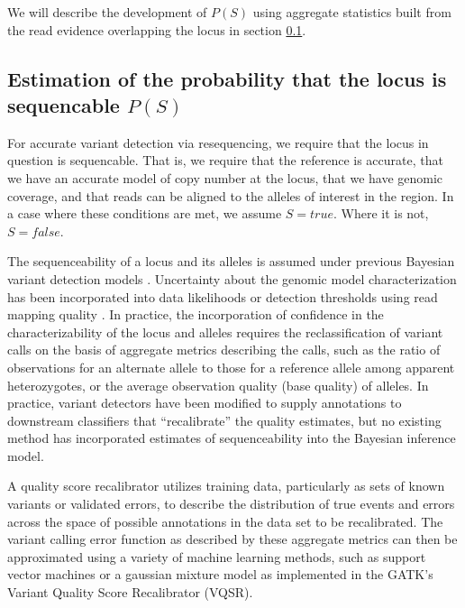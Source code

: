 \documentclass{article}
\begin{document}
We will describe the development of $P(S)$ using aggregate statistics built from the read evidence overlapping the locus in section \ref{sec:sequencable}.

\subsection{Estimation of the probability that the locus is sequencable $P(S)$}
\label{sec:sequencable}

For accurate variant detection via resequencing, we require that the locus in question is sequencable.  That is, we require that the reference is accurate, that we have an accurate model of copy number at the locus, that we have genomic coverage, and that reads can be aligned to the alleles of interest in the region.  In a case where these conditions are met, we assume $S = true$.  Where it is not, $S = false$.

The sequenceability of a locus and its alleles is assumed under previous Bayesian variant detection models \citep{marth99, samtools, li2011stats}.  Uncertainty about the genomic model characterization has been incorporated into data likelihoods or detection thresholds using read mapping quality \citep{snptools, maq}.  In practice, the incorporation of confidence in the characterizability of the locus and alleles requires the reclassification of variant calls on the basis of aggregate metrics describing the calls, such as the ratio of observations for an alternate allele to those for a reference allele among apparent heterozygotes, or the average observation quality (base quality) of alleles.  In practice, variant detectors have been modified to supply annotations to downstream classifiers that ``recalibrate'' the quality estimates, but no existing method has incorporated estimates of sequenceability into the Bayesian inference model.

A quality score recalibrator utilizes training data, particularly as sets of known variants or validated errors, to describe the distribution of true events and errors across the space of possible annotations in the data set to be recalibrated.  The variant calling error function as described by these aggregate metrics can then be approximated using a variety of machine learning methods, such as support vector machines \citep{snpsvm} or a gaussian mixture model as implemented in the GATK's Variant Quality Score Recalibrator (VQSR).
\end{document}
